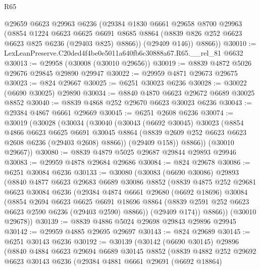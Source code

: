 \begin{lexlean}{R65}
\begin{coremodule}
{        @29659
        @6623
        @29963
        @6236
        (@29384
          @1830
          @6661
          @29658
          @8700
          @29963
          (@8854
            @1224
            @6623
            @6625
            @6691
            @8685
            @8864
            (@8839 @826 @252 @6623 @6623 @825 @6236 (@29403 @825) @8866))
          (@29409 @146))
        @8866))
@30010 := LexLeanPreserve.C20ded4f4be0e5011a640fb6c30888a67.R65.__rel_81 @6632
@30013 := @29958 (@30008 (@30010 @29656))
@30019 := @8839 @4872 @5026 @29676 @29845 @29890 @29947
@30022 := @29959 @4871 @29673 @29675
@30023 := @824 @29667
@30025 := @6251 @30023 @6236
@30028 := @30022 (@6690 @30025) @29890
@30034 := @8840 @4870 @6623 @29672 @6689 @30025 @8852
@30040 := @8839 @4868 @252 @29670 @6623 @30023 @6236
@30043 := @29384 @4867 @6661 @29669
@30045 := @6251 @2608 @6236
@30074 := @30019
    (@30028
      (@30034
        (@30040
          (@30043
            (@6692 @30045)
            @30023
            (@8854
              @4866
              @6623
              @6625
              @6691
              @30045
              @8864
              (@8839 @2609 @252 @6623 @6623 @2608 @6236 (@29403 @2608) @8866))
            (@29409 @158))
          @8866))
      (@30010 @29667))
@30080 := @8839 @4879 @5025 @29687 @29844 @29893 @29946
@30083 := @29959 @4878 @29684 @29686
@30084 := @824 @29678
@30086 := @6251 @30084 @6236
@30133 := @30080
    (@30083
      (@6690 @30086)
      @29893
      (@8840
        @4877
        @6623
        @29683
        @6689
        @30086
        @8852
        (@8839
          @4875
          @252
          @29681
          @6623
          @30084
          @6236
          (@29384
            @4874
            @6661
            @29680
            (@6692 @18696)
            @30084
            (@8854
              @2694
              @6623
              @6625
              @6691
              @18696
              @8864
              (@8839 @2591 @252 @6623 @6623 @2590 @6236 (@29403 @2590) @8866))
            (@29409 @174))
          @8866))
      (@30010 @29678))
@30139 := @8839 @4886 @5024 @29698 @29843 @29896 @29945
@30142 := @29959 @4885 @29695 @29697
@30143 := @824 @29689
@30145 := @6251 @30143 @6236
@30192 := @30139
    (@30142
      (@6690 @30145)
      @29896
      (@8840
        @4884
        @6623
        @29694
        @6689
        @30145
        @8852
        (@8839
          @4882
          @252
          @29692
          @6623
          @30143
          @6236
          (@29384
            @4881
            @6661
            @29691
            (@6692 @18864)
}
\end{coremodule}
\end{lexlean}

